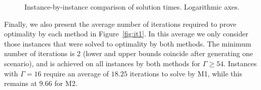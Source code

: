 \documentclass[a4paper,11pt,abstracton]{scrartcl}
\theoremstyle{definition}
\theoremstyle{remark}
\begin{document}
\begin{figure}[htbp]
\begin{center}
%
\hfill
{}
\end{center}
\caption{Instance-by-instance comparison of solution times. Logarithmic axes.\label{fig:tvst}}
\end{figure}

Finally, we also present the average number of iterations required to prove optimality by each method in Figure~\ref{fig:it1}. In this average we only consider those instances that were solved to optimality by both methods. The minimum number of iterations is 2 (lower and upper bounds coincide after generating one scenario), and is achieved on all instances by both methods for $\Gamma \ge 54$. Instances with $\Gamma=16$ require an average of $18.25$ iterations to solve by M1, while this remains at $9.66$ for M2.
\end{document}
